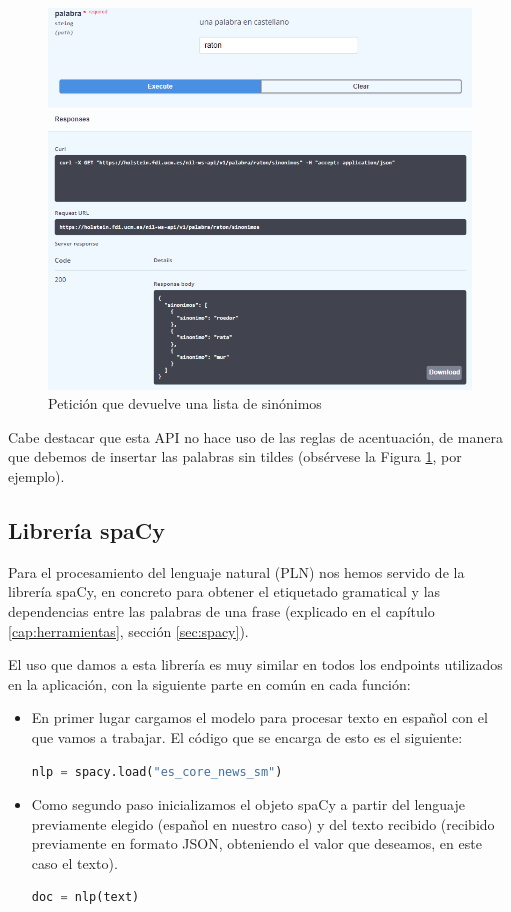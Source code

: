 \begin{itemize}
\begin{figure}[h!]
	
	\includegraphics[scale=1]{Imagenes/Figuras/APISinonimos}
	
	
	\caption{Petición que devuelve una lista de sinónimos}
	\label{fig:apiSinonimo}
\end{figure}
\end{itemize}

Cabe destacar que esta API no hace uso de las reglas de acentuación, de manera que debemos de insertar las palabras sin tildes (obsérvese la Figura \ref{fig:apiSinonimo}, por ejemplo).

\subsection{Librería spaCy}\label{subsec:libreriaSpacy}

Para el procesamiento del lenguaje natural (PLN) nos hemos servido de la librería spaCy, en concreto para obtener el etiquetado gramatical y las dependencias entre las palabras de una frase (explicado en el capítulo \ref{cap:herramientas}, sección \ref{sec:spacy}).

El uso que damos a esta librería es muy similar en todos los endpoints utilizados en la aplicación, con la siguiente parte en común en cada función:
\begin{itemize}
	\item En primer lugar cargamos el modelo para procesar texto en español con el que vamos a trabajar. El código que se encarga de esto es el siguiente:
	\begin{lstlisting}[language=python,firstnumber=1]
		nlp = spacy.load("es_core_news_sm")
	\end{lstlisting}
\item Como segundo paso inicializamos el objeto spaCy a partir del lenguaje previamente elegido (español en nuestro caso) y del texto recibido (recibido previamente en formato JSON, obteniendo el valor que deseamos, en este caso el texto).
	\begin{lstlisting}[language=python,firstnumber=1]
	doc = nlp(text)
\end{lstlisting}
\end{itemize}



